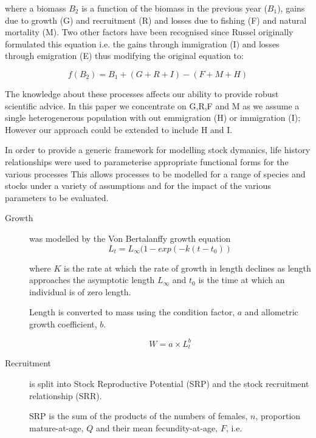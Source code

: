 \documentclass{pnastwo}
\begin{document}
\begin{article}
where a biomass $B_2$ is a function of the biomass in the previous year ($B_1$), gains due to growth (G) and recruitment (R) and losses due to 
fishing (F) and natural mortality (M). Two other factors have been recognised since Russel originally formulated this equation i.e. 
the gains through immigration (I) and losses through emigration (E) thus modifying the original equation to:

\begin{equation}f(B_2) = B_1 + (G+R+I) - (F+M+H)\end{equation}

The knowledge about these processes affects our ability to provide robust scientific advice. In this paper we concentrate 
on G,R,F and M as we assume a single heterogenerous population with out emmigration (H) or immigration (I); However our approach could be extended to include H and I.

In order to provide a generic framework for modelling stock dymanics, life history relationships were used to parameterise appropriate functional forms for 
the various processes  This allows processes to be modelled for a range of species and stocks under a variety of assumptions and for the impact of the various parameters
to be evaluated.  


\begin{description}
    \item[Growth] was modelled by the Von Bertalanffy growth equation \cite{von1957quantitative}
      \begin{equation} L_t = L_{\infty}(1 - exp(-k(t-t_0)) \end{equation}
         
where $K$ is the rate at which the rate of growth in length declines as length approaches the asymptotic length  $L_{\infty}$ 
and $t_{0}$ is the time at which an individual is of zero length. 

Length is converted to mass using the condition factor, $a$ and allometric growth coefficient, $b$.

\begin{equation} W = a \times L_t^b \end{equation}

 \item[Recruitment] is split into Stock Reproductive Potential (SRP) and the stock recruitment relationship (SRR).

SRP is the sum of the products of the numbers of females, $n$, proportion mature-at-age, $Q$ and their mean fecundity-at-age, $F$, i.e. 


\end{description}
\end{article}
\end{document}
